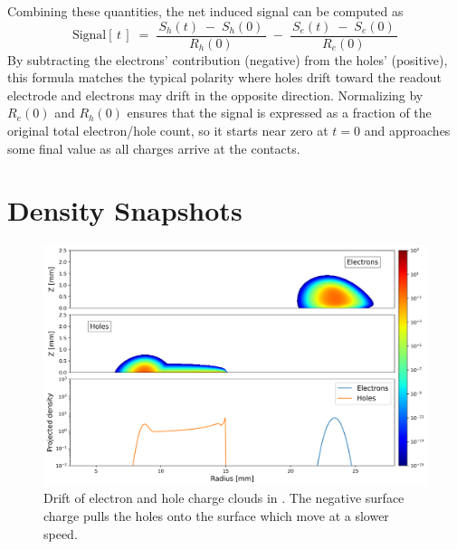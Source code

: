 Combining these quantities, the net induced signal can be computed as
\begin{equation}
\text{Signal}[\,t\,] 
\;=\;
  \frac{\,S_h(t)\;-\;S_h(0)\,}{\,R_{h}(0)\,}
  \;-\;
  \frac{\,S_e(t)\;-\;S_e(0)\,}{\,R_{e}(0)\,}
\label{eq:net-signal}
\end{equation}
By subtracting the electrons’ contribution 
(negative) from the holes’ (positive), this formula matches the typical polarity 
where holes drift toward the readout electrode and electrons may drift in the 
opposite direction. Normalizing by $R_{e}(0)$ and $R_{h}(0)$ ensures that the 
signal is expressed as a fraction of the original total electron/hole count, 
so it starts near zero at $t=0$ and approaches some final value as all charges 
arrive at the contacts.



\section{Density Snapshots}
\begin{figure}[!htb]
    \includegraphics[trim={0cm 0 0cm 0},clip,width=0.99\linewidth]{ch3/figs/drift_path_sc=-0.3.png}
    \caption{Drift of electron and hole charge clouds in {\tdsim}. The negative surface charge pulls the holes onto the surface which move at a slower speed.}
    \label{ch3:fig:ehd_path_pd_sc-0.3}
\end{figure}

